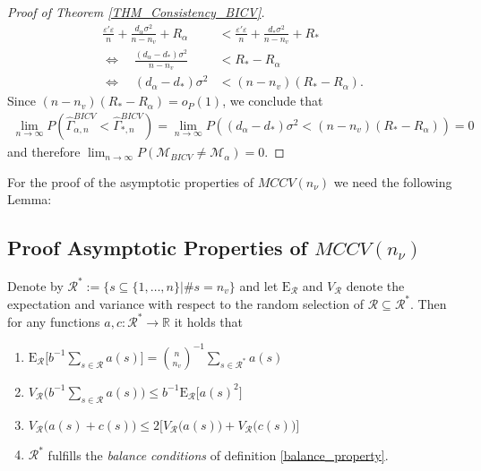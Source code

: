 \documentclass[Research_Module_ES.tex]{subfiles}
\begin{document}
\begin{proof}[Proof of Theorem \ref{THM_Consistency_BICV}]
\begin{align*}
	\frac{\varepsilon'\varepsilon}{n}+\frac{d_\alpha\sigma^2}{n-n_v} +R_\alpha
	&< \frac{\varepsilon'\varepsilon}{n}+\frac{d_\ast\sigma^2}{n-n_v} +R_\ast\\
	\iff \quad \frac{(d_\alpha-d_\ast)\sigma^2}{n-n_v} &< R_\ast -R_\alpha\\
	\iff \quad(d_\alpha-d_\ast)\sigma^2 &< (n-n_v)(R_\ast -R_\alpha).
	\end{align*}
	Since $(n-n_v)(R_\ast -R_\alpha)=o_P(1)$, we conclude that 
	\begin{align*}
	\lim_{n\to\infty} P\left(\hat{\Gamma}_{\alpha,n}^{BICV} < \hat{\Gamma}_{\ast,n}^{BICV}\right) 
	=\lim_{n\to\infty}P\left((d_\alpha-d_\ast)\sigma^2 < (n-n_v)(R_\ast -R_\alpha)\right) = 0 
	\end{align*}
	and therefore $\lim_{n\to\infty}P(\mathcal{M}_{BICV}\neq \mathcal{M}_\alpha) = 0$.
\end{proof}

For the proof of the asymptotic properties of $MCCV(n_\nu)$ we need the following Lemma:  
\subsection{Proof Asymptotic Properties of $MCCV(n_\nu)$}
\begin{lemma}
	\label{Lemma_MCCV}
	Denote by $\mathcal{R}^\ast:= \{s\subseteq\{1,\dots,n\}|\# s=n_v\}$ and let $\mathrm{E}_\mathcal{R}$ and $V_\mathcal{R}$ denote the expectation and variance with respect to the random selection of $\mathcal{R}\subseteq\mathcal{R}^\ast$. Then for any functions $a,c:\mathcal{R}^\ast\to \mathbb{R}$ it holds that
	\begin{enumerate}
		\item $\mathrm{E}_\mathcal{R} \bigl[ b^{-1}\sum_{s\in \mathcal{R}}a(s)\bigr] = \binom{n}{n_v}^{-1}\sum_{s\in\mathcal{R}^\ast}a(s)$
		\item $V_\mathcal{R} \bigl( b^{-1}\sum_{s\in \mathcal{R}}a(s)\bigr) \le b^{-1} \mathrm{E}_\mathcal{R} \bigl[a(s)^2\bigr]$
		\item $V_\mathcal{R}\bigl(a(s)+c(s)\bigr) \le 2\bigl[V_\mathcal{R}\bigl(a(s)\bigr)+V_\mathcal{R}\bigl(c(s)\bigr)\bigr]$
		\item $\mathcal{R}^\ast$ fulfills the \textit{balance conditions} of definition \ref{balance_property}.
	\end{enumerate}
\end{lemma}
\end{document}
